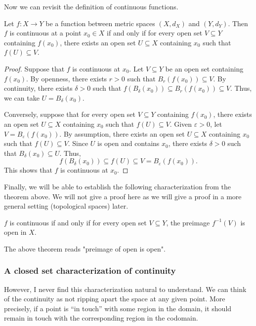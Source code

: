 Now we can revisit the definition of continuous functions.

\begin{theorem}
  Let $f:X\to Y$ be a function between metric spaces $(X,d_X)$ and $(Y,d_Y)$. Then $f$ is continuous at a point $x_0\in X$ if and only if for every open set $V\subseteq Y$ containing $f(x_0)$, there exists an open set $U\subseteq X$ containing $x_0$ such that $f(U)\subseteq V$. 
\end{theorem}
\begin{proof}
  Suppose that $f$ is continuous at $x_0$. Let $V\subseteq Y$ be an open set containing $f(x_0)$. By openness, there exists $r>0$ such that $B_r(f(x_0))\subseteq V$. By continuity, there exists $\delta>0$ such that $f(B_\delta(x_0))\subseteq B_r(f(x_0))\subseteq V$. Thus, we can take $U=B_\delta(x_0)$.

  Conversely, suppose that for every open set $V\subseteq Y$ containing $f(x_0)$, there exists an open set $U\subseteq X$ containing $x_0$ such that $f(U)\subseteq V$. Given $\varepsilon>0$, let $V=B_\varepsilon(f(x_0))$. By assumption, there exists an open set $U\subseteq X$ containing $x_0$ such that $f(U)\subseteq V$. Since $U$ is open and contains $x_0$, there exists $\delta>0$ such that $B_\delta(x_0)\subseteq U$. Thus,
  \[
  f(B_\delta(x_0))\subseteq f(U)\subseteq V = B_\varepsilon(f(x_0)).
  \]
  This shows that $f$ is continuous at $x_0$. 
\end{proof}

Finally, we will be able to establish the following characterization from the theorem above. We will not give a proof here as we will give a proof in a more general setting (topological spaces) later.

\begin{theorem}
  $f$ is continuous if and only if for every open set $V\subseteq Y$, the preimage $f^{-1}(V)$ is open in $X$.
\end{theorem}

The above theorem reads "preimage of open is open".


\subsubsection{A closed set characterization of continuity}
However, I never find this characterization natural to understand. We can think of the continuity as not ripping apart the space at any given point. More precisely, if a point is ``in touch'' with some region in the domain, it should remain in touch with the corresponding region in the codomain.

